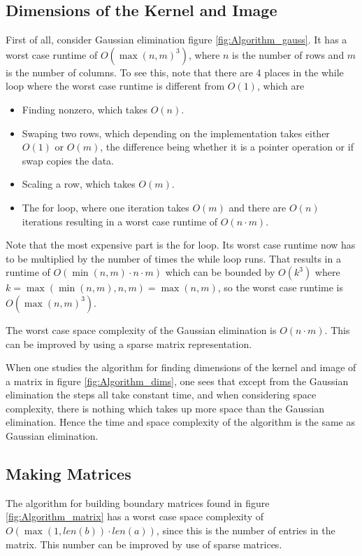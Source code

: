 \documentclass[11pt,a4paper,twoside]{report}
\begin{document}
\subsection{Dimensions of the Kernel and Image}
First of all, consider Gaussian elimination figure \ref{fig:Algorithm_gauss}. It has a worst case runtime of $O(\max(n,m)^3)$, where $n$ is the number of rows and $m$ is the number of columns. To see this, note that there are 4 places in the while loop where the worst case runtime is different from $O(1)$, which are 
\begin{itemize}
\item Finding nonzero, which takes $O(n)$.
\item Swaping two rows, which depending on the implementation takes either $O(1)$ or $O(m)$, the difference being whether it is a pointer operation or if swap copies the data.
\item Scaling a row, which takes $O(m)$.
\item The for loop, where one iteration takes $O(m)$ and there are $O(n)$ iterations resulting in a worst case runtime of $O(n\cdot m)$.
\end{itemize}
Note that the most expensive part is the for loop. Its worst case runtime now has to be multiplied by the number of times the while loop runs. That results in a runtime of $O(\min(n,m)\cdot n \cdot m)$ which can be bounded by $O(k^3)$ where $k = \max(\min(n,m), n, m)=\max(n,m)$, so the worst case runtime is $O(\max(n,m)^3)$.

The worst case space complexity of the Gaussian elimination is $O(n\cdot m)$. This can be improved by using a sparse matrix representation.

When one studies the algorithm for finding dimensions of the kernel and image of a matrix in figure \ref{fig:Algorithm_dims}, one sees that except from the Gaussian elimination the steps all take constant time, and when considering space complexity, there is nothing which takes up more space than the Gaussian elimination. Hence the time and space complexity of the algorithm is the same as Gaussian elimination.

\subsection{Making Matrices}
The algorithm for building boundary matrices found in figure \ref{fig:Algorithm_matrix} has a worst case space complexity of $O(\max(1,len(b))\cdot len(a))$, since this is the number of entries in the matrix. This number can be improved by use of sparse matrices.
\end{document}
